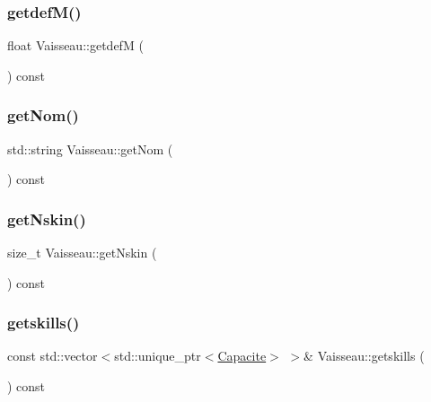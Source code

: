 \mbox{\label{class_vaisseau_a761444b2f44feb6b555ba770e72b2091}} 
\subsubsection{\texorpdfstring{getdef\+M()}{getdefM()}}
{\footnotesize\ttfamily float Vaisseau\+::getdefM (\begin{DoxyParamCaption}{ }\end{DoxyParamCaption}) const\hspace{0.3cm}{\ttfamily [inline]}}

\mbox{\label{class_vaisseau_a57c40e657151598e9f5ffd3dd2fdc15a}} 
\subsubsection{\texorpdfstring{get\+Nom()}{getNom()}}
{\footnotesize\ttfamily std\+::string Vaisseau\+::get\+Nom (\begin{DoxyParamCaption}{ }\end{DoxyParamCaption}) const\hspace{0.3cm}{\ttfamily [inline]}}

\mbox{\label{class_vaisseau_a61a0c0d457d87ebc081b5dea42748e78}} 
\subsubsection{\texorpdfstring{get\+Nskin()}{getNskin()}}
{\footnotesize\ttfamily size\+\_\+t Vaisseau\+::get\+Nskin (\begin{DoxyParamCaption}{ }\end{DoxyParamCaption}) const\hspace{0.3cm}{\ttfamily [inline]}}

\mbox{\label{class_vaisseau_a7026c8c71519ca32d0e41ff455775edc}} 
\subsubsection{\texorpdfstring{getskills()}{getskills()}}
{\footnotesize\ttfamily const std\+::vector$<$std\+::unique\+\_\+ptr$<$\mbox{\hyperlink{class_capacite}{Capacite}}$>$ $>$\& Vaisseau\+::getskills (\begin{DoxyParamCaption}{ }\end{DoxyParamCaption}) const\hspace{0.3cm}{\ttfamily [inline]}}

